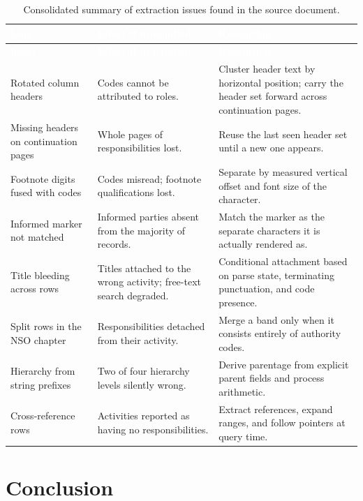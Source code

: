 \begin{longtable}{|p{}|p{}|p{}|}
\caption{Consolidated summary of extraction issues found in the source document.}\label{tab:issues}\\
\hline
\rowcolor{thesisgreen}\textcolor{white}{\textbf{Issue}} & \textcolor{white}{\textbf{Effect if unhandled}} & \textcolor{white}{\textbf{Resolution}} \\
\hline
\endfirsthead
\hline
\rowcolor{thesisgreen}\textcolor{white}{\textbf{Issue}} & \textcolor{white}{\textbf{Effect if unhandled}} & \textcolor{white}{\textbf{Resolution}} \\
\hline
\endhead
Rotated column headers & Codes cannot be attributed to roles. & Cluster header text by horizontal position; carry the header set forward across continuation pages. \\ \hline
Missing headers on continuation pages & Whole pages of responsibilities lost. & Reuse the last seen header set until a new one appears. \\ \hline
Footnote digits fused with codes & Codes misread; footnote qualifications lost. & Separate by measured vertical offset and font size of the character. \\ \hline
Informed marker not matched & Informed parties absent from the majority of records. & Match the marker as the separate characters it is actually rendered as. \\ \hline
Title bleeding across rows & Titles attached to the wrong activity; free-text search degraded. & Conditional attachment based on parse state, terminating punctuation, and code presence. \\ \hline
Split rows in the NSO chapter & Responsibilities detached from their activity. & Merge a band only when it consists entirely of authority codes. \\ \hline
Hierarchy from string prefixes & Two of four hierarchy levels silently wrong. & Derive parentage from explicit parent fields and process arithmetic. \\ \hline
Cross-reference rows & Activities reported as having no responsibilities. & Extract references, expand ranges, and follow pointers at query time. \\ \hline
\end{longtable}

\section*{Conclusion}

